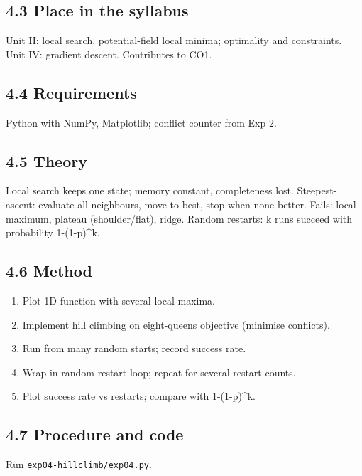 \documentclass[
]{article}
\newcounter{none} %
\providecommand{\tightlist}{%
  \setlength{\itemsep}{0pt}\setlength{\parskip}{0pt}}
\begin{document}
\subsection{4.3 Place in the syllabus}\label{place-in-the-syllabus-3}

Unit II: local search, potential-field local minima; optimality and
constraints. Unit IV: gradient descent. Contributes to CO1.

\subsection{4.4 Requirements}\label{requirements-3}

Python with NumPy, Matplotlib; conflict counter from Exp 2.

\subsection{4.5 Theory}\label{theory-3}

Local search keeps one state; memory constant, completeness lost.
Steepest-ascent: evaluate all neighbours, move to best, stop when none
better. Fails: local maximum, plateau (shoulder/flat), ridge. Random
restarts: k runs succeed with probability 1-(1-p)\^{}k.

\subsection{4.6 Method}\label{method-3}

\begin{enumerate}
\def\labelenumi{\arabic{enumi}.}
\tightlist
\item
  Plot 1D function with several local maxima.
\item
  Implement hill climbing on eight-queens objective (minimise
  conflicts).
\item
  Run from many random starts; record success rate.
\item
  Wrap in random-restart loop; repeat for several restart counts.
\item
  Plot success rate vs restarts; compare with 1-(1-p)\^{}k.
\end{enumerate}

\subsection{4.7 Procedure and code}\label{procedure-and-code-3}

Run \texttt{exp04-hillclimb/exp04.py}.
\end{document}
